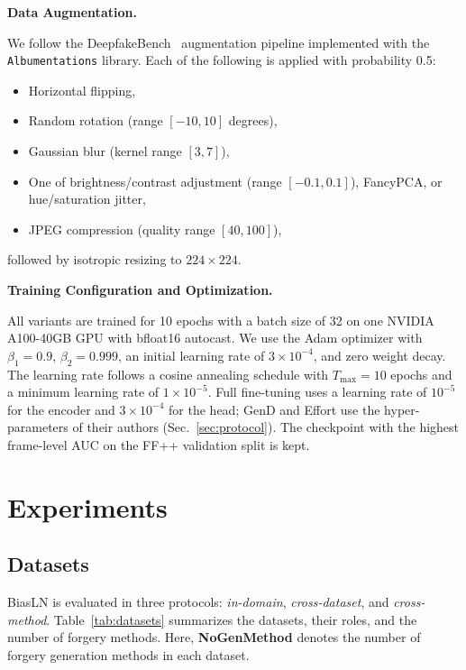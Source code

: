 \documentclass[fonts]{icst}
\begin{document}
\noindent\textbf{Data Augmentation.}\par
We follow the DeepfakeBench~\cite{yan2023deepfakebench} augmentation pipeline implemented with the \texttt{Albumentations} library. Each of the following is applied with probability 0.5:
\begin{itemize}[leftmargin=*, topsep=2pt, itemsep=2pt, label=--]
    \item Horizontal flipping,
    \item Random rotation (range $[-10, 10]$ degrees),
    \item Gaussian blur (kernel range $[3, 7]$),
    \item One of brightness/contrast adjustment (range $[-0.1, 0.1]$), FancyPCA, or hue/saturation jitter,
    \item JPEG compression (quality range $[40, 100]$),
\end{itemize}
followed by isotropic resizing to $224\times224$.

\noindent\textbf{Training Configuration and Optimization.}\par
All variants are trained for 10 epochs with a batch size of 32 on one NVIDIA A100-40GB GPU with bfloat16 autocast.
We use the Adam optimizer with $\beta_1 = 0.9$, $\beta_2 = 0.999$, an initial learning rate of $3 \times 10^{-4}$, and zero weight decay.
The learning rate follows a cosine annealing schedule with $T_{\max}=10$ epochs and a minimum learning rate of $1 \times 10^{-5}$.
Full fine-tuning uses a learning rate of $10^{-5}$ for the encoder and $3\times10^{-4}$ for the head; GenD and Effort use the hyper-parameters of their authors (Sec.~\ref{sec:protocol}). The checkpoint with the highest frame-level AUC on the FF++ validation split is kept.


\section{Experiments}
\subsection{Datasets}
\label{sec:datasets}
\label{sec:protocol}

BiasLN is evaluated in three protocols: \textit{in-domain}, \textit{cross-dataset}, and \textit{cross-method}.
Table~\ref{tab:datasets} summarizes the datasets, their roles, and the number of forgery methods.
Here, \textbf{NoGenMethod} denotes the number of forgery generation methods in each dataset.
\end{document}
